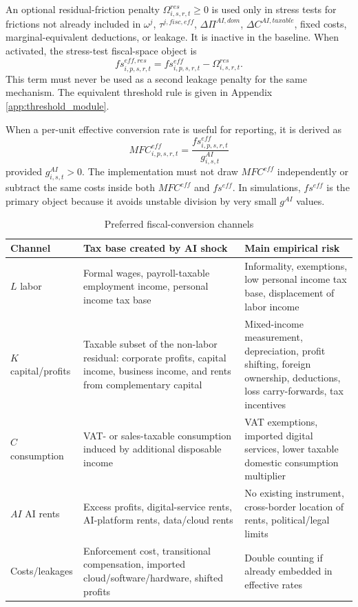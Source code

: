 \documentclass[11pt,a4paper]{article}
\begin{document}
An optional residual-friction penalty $\Omega^{res}_{i,s,r,t}\geq0$ is used only in stress tests for frictions not already included in $\omega^j$, $\tau^{j,fisc,eff}$, $\Delta\Pi^{AI,dom}$, $\Delta C^{AI,taxable}$, fixed costs, marginal-equivalent deductions, or leakage. It is inactive in the baseline. When activated, the stress-test fiscal-space object is
\begin{equation}\label{eq:omega_res_stress_v17}
    fs^{eff,res}_{i,p,s,r,t}=fs^{eff}_{i,p,s,r,t}-\Omega^{res}_{i,s,r,t}.
\end{equation}
This term must never be used as a second leakage penalty for the same mechanism. The equivalent threshold rule is given in Appendix \ref{app:threshold_module}.

When a per-unit effective conversion rate is useful for reporting, it is derived as
\begin{equation}\label{eq:mfc_eff_v17}
    MFC^{eff}_{i,p,s,r,t}=\frac{fs^{eff}_{i,p,s,r,t}}{g^{AI}_{i,s,t}}
\end{equation}
provided $g^{AI}_{i,s,t}>0$. The implementation must not draw $MFC^{eff}$ independently or subtract the same costs inside both $MFC^{eff}$ and $fs^{eff}$. In simulations, $fs^{eff}$ is the primary object because it avoids unstable division by very small $g^{AI}$ values.

\begin{table}[H]
\centering
\caption{Preferred fiscal-conversion channels}
\label{tab:preferred_fiscal_channels}
\small
\begin{tabular}{p{}p{}p{}}
\toprule
Channel & Tax base created by AI shock & Main empirical risk \\
\midrule
$L$ labor & Formal wages, payroll-taxable employment income, personal income tax base & Informality, exemptions, low personal income tax base, displacement of labor income \\
$K$ capital/profits & Taxable subset of the non-labor residual: corporate profits, capital income, business income, and rents from complementary capital & Mixed-income measurement, depreciation, profit shifting, foreign ownership, deductions, loss carry-forwards, tax incentives \\
$C$ consumption & VAT- or sales-taxable consumption induced by additional disposable income & VAT exemptions, imported digital services, lower taxable domestic consumption multiplier \\
$AI$ AI rents & Excess profits, digital-service rents, AI-platform rents, data/cloud rents & No existing instrument, cross-border location of rents, political/legal limits \\
Costs/leakages & Enforcement cost, transitional compensation, imported cloud/software/hardware, shifted profits & Double counting if already embedded in effective rates \\
\bottomrule
\end{tabular}
\end{table}
\end{document}
